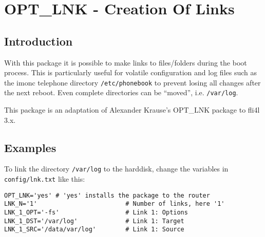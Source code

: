 {
\section {OPT\_LNK - Creation Of Links}
}

\subsection {Introduction}

With this package it is possible to make links to files/folders during
the boot process. This is particularly useful for volatile configuration
and log files such as the imonc telephone directory \texttt{/etc/phonebook}
to prevent losing all changes after the next reboot. Even complete
directories can be ``moved'', i.e. \texttt{/var/log}.

This package is an adaptation of Alexander Krause's OPT\_LNK package to
fli4l 3.x.

\subsection {Examples}

To link the directory \texttt{/var/log} to the harddisk, change the variables
in \texttt{config/lnk.txt} like this:

\begin{small}
\begin{example}
\begin{verbatim}
OPT_LNK='yes' # 'yes' installs the package to the router
LNK_N='1'                        # Number of links, here '1'
LNK_1_OPT='-fs'                  # Link 1: Options
LNK_1_DST='/var/log'             # Link 1: Target
LNK_1_SRC='/data/var/log'        # Link 1: Source
\end{verbatim}
\end{example}
\end{small}



